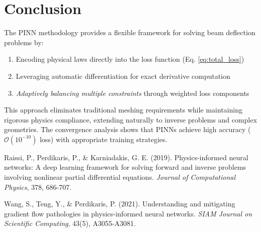 \documentclass[12pt]{article}
\begin{document}
\section{Conclusion}
The PINN methodology provides a flexible framework for solving beam deflection problems by:
\begin{enumerate}
    \item Encoding physical laws directly into the loss function (Eq. \ref{eq:total_loss})
    \item Leveraging automatic differentiation for exact derivative computation
    \item \textit{Adaptively balancing multiple constraints} through weighted loss components
\end{enumerate}
This approach eliminates traditional meshing requirements while maintaining rigorous physics compliance, extending naturally to inverse problems and complex geometries. The convergence analysis shows that PINNs achieve high accuracy ($\mathcal{O}(10^{-10})$ loss) with appropriate training strategies.

\begin{thebibliography}{9}
Raissi, P., Perdikaris, P., \& Karniadakis, G. E. (2019). 
Physics-informed neural networks: A deep learning framework for solving forward and inverse problems involving nonlinear partial differential equations. 
\textit{Journal of Computational Physics}, 378, 686-707.

Wang, S., Teng, Y., \& Perdikaris, P. (2021). 
Understanding and mitigating gradient flow pathologies in physics-informed neural networks. 
\textit{SIAM Journal on Scientific Computing}, 43(5), A3055-A3081.
\end{thebibliography}
\end{document}

